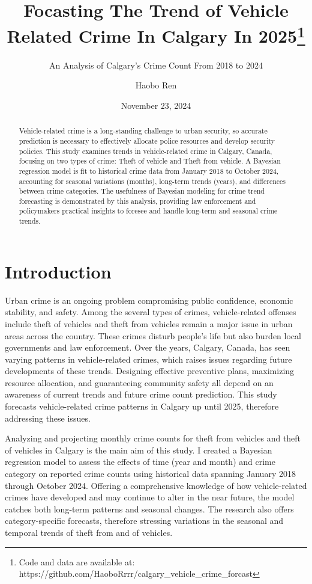 \documentclass[
  letterpaper,
  DIV=11,
  numbers=noendperiod]{scrartcl}
\title{Focasting The Trend of Vehicle Related Crime In Calgary In
2025\thanks{Code and data are available at:
https://github.com/HaoboRrrr/calgary\_vehicle\_crime\_forcast}}
\subtitle{An Analysis of Calgary's Crime Count From 2018 to 2024}
\author{Haobo Ren}
\date{November 23, 2024}
\begin{document}
\maketitle
\begin{abstract}
Vehicle-related crime is a long-standing challenge to urban security, so
accurate prediction is necessary to effectively allocate police
resources and develop security policies. This study examines trends in
vehicle-related crime in Calgary, Canada, focusing on two types of
crime: Theft of vehicle and Theft from vehicle. A Bayesian regression
model is fit to historical crime data from January 2018 to October 2024,
accounting for seasonal variations (months), long-term trends (years),
and differences between crime categories. The usefulness of Bayesian
modeling for crime trend forecasting is demonstrated by this analysis,
providing law enforcement and policymakers practical insights to foresee
and handle long-term and seasonal crime trends.
\end{abstract}


\section{Introduction}\label{introduction}

Urban crime is an ongoing problem compromising public confidence,
economic stability, and safety. Among the several types of crimes,
vehicle-related offenses include theft of vehicles and theft from
vehicles remain a major issue in urban areas across the country. These
crimes disturb people's life but also burden local governments and law
enforcement. Over the years, Calgary, Canada, has seen varying patterns
in vehicle-related crimes, which raises issues regarding future
developments of these trends. Designing effective preventive plans,
maximizing resource allocation, and guaranteeing community safety all
depend on an awareness of current trends and future crime count
prediction. This study forecasts vehicle-related crime patterns in
Calgary up until 2025, therefore addressing these issues.

Analyzing and projecting monthly crime counts for theft from vehicles
and theft of vehicles in Calgary is the main aim of this study. I
created a Bayesian regression model to assess the effects of time (year
and month) and crime category on reported crime counts using historical
data spanning January 2018 through October 2024. Offering a
comprehensive knowledge of how vehicle-related crimes have developed and
may continue to alter in the near future, the model catches both
long-term patterns and seasonal changes. The research also offers
category-specific forecasts, therefore stressing variations in the
seasonal and temporal trends of theft from and of vehicles.
\end{document}
